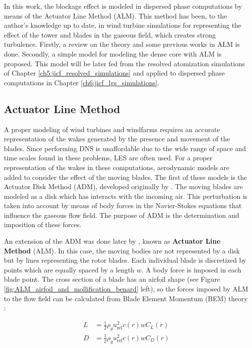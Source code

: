 In this work, the blockage effect is modeled in dispersed phase computations by means of the Actuator Line Method (ALM). This method has been, to the author's knowledge up to date, in wind turbine simulations for representing the effect of the tower and blades in the gaseous field, which creates strong turbulence. Firstly, a review on the theory and some previous works in ALM is done. Secondly, a simple model for modeling the dense core with ALM is proposed. This model will be later fed from the resolved atomization simulations of Chapter \ref{ch5:jicf_resolved_simulations} and applied to dispersed phase computations in Chapter \ref{ch6:jicf_lgs_simulations}.


\subsection{Actuator Line Method}

A proper modeling of wind turbines and windfarms requires an accurate representation of the wakes generated by the presence and movement of the blades. Since performing DNS is unaffordable due to the wide range of space and time scales found in these problems, LES are often used. For a proper representation of the wakes in these computations, aerodynamic models are added to consider the effect of the moving blades. The first of these models is the Actuator Disk Method (ADM), developed originally by . The moving blades are modeled as a disk which has interacts with the incoming air. This perturbation is taken into account by means of body forces in the Navier-Stokes equations that influence the gaseous flow field. The purpose of ADM is the determination and imposition of these forces.

An extension of the ADM was done later by , known as \textbf{Actuator Line Method} (ALM). In this case, the moving bodies are not represented by a disk but by lines representing the rotor blades. Each individual blade is discretized by points which are equally spaced by a length $w$. A body force is imposed in each blade point. The cross section of a blade has an airfoil shape (see Figure \ref{fig:ALM_airfoil_and_mollification_benard} left), so the forces imposed by ALM to the flow field can be calculated from Blade Element Momentum (BEM) theory :

\begin{subequations}
\label{eq:ALM_lift_drag_definitions}
\begin{align}
L &= \frac{1}{2} \rho_g u_\mathrm{rel}^2 c \left( r \right) w C_L \left( r \right) \\
D &= \frac{1}{2} \rho_g u_\mathrm{rel}^2 c \left( r \right) w C_D \left( r \right)
\end{align}
\end{subequations}

